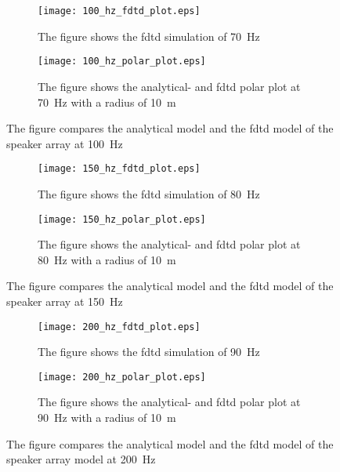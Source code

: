 \begin{figure}[H]
\centering
\begin{subfigure}[htbp]{0.55\textwidth}
		\texttt{[image: 100\_hz\_fdtd\_plot.eps]}
		\caption{The figure shows the \gls{fdtd} simulation of \SI{70}{\hertz}}
		\label{fig:fdtd_100_Hz}
\end{subfigure}
\begin{subfigure}[htbp]{0.35\textwidth}
		\texttt{[image: 100\_hz\_polar\_plot.eps]}
		\caption{The figure shows the analytical- and \gls{fdtd} polar plot at \SI{70}{\hertz} with a radius of \SI{10}{\meter}}
		\label{fig:polar_100_Hz}
\end{subfigure} 
\caption{The figure compares the analytical model and the \gls{fdtd} model of the speaker array at \SI{100}{\hertz}}
\end{figure}


\begin{figure}[H]
\centering
\begin{subfigure}[htbp]{0.55\textwidth}
		\texttt{[image: 150\_hz\_fdtd\_plot.eps]}
		\caption{The figure shows the \gls{fdtd} simulation of \SI{80}{\hertz}}
		\label{fig:fdtd_150_Hz}
\end{subfigure}
\begin{subfigure}[htbp]{0.35\textwidth}
		\texttt{[image: 150\_hz\_polar\_plot.eps]}
		\caption{The figure shows the analytical- and \gls{fdtd} polar plot at \SI{80}{\hertz} with a radius of \SI{10}{\meter}}
		\label{fig:polar_150_Hz}
\end{subfigure} 
\caption{The figure compares the analytical model and the \gls{fdtd} model of the speaker array at \SI{150}{\hertz}}
\end{figure}


\begin{figure}[H]
\centering
\begin{subfigure}[htbp]{0.55\textwidth}
		\texttt{[image: 200\_hz\_fdtd\_plot.eps]}
		\caption{The figure shows the \gls{fdtd} simulation of \SI{90}{\hertz}}
		\label{fig:fdtd_200_Hz}
\end{subfigure}
\begin{subfigure}[htbp]{0.35\textwidth}
		\texttt{[image: 200\_hz\_polar\_plot.eps]}
		\caption{The figure shows the analytical- and \gls{fdtd} polar plot at \SI{90}{\hertz} with a radius of \SI{10}{\meter}}
		\label{fig:polar_200_Hz}
\end{subfigure} 
\caption{The figure compares the analytical model and the \gls{fdtd} model of the speaker array model at \SI{200}{\hertz}}
\end{figure}


